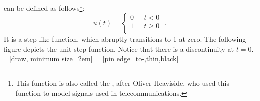  can be defined as
follows\footnote{This function is also called the
  , after Oliver
  Heaviside, who used this function to model signals used in
  telecommunications.}:
\begin{equation}
  u(t) = \left\{\begin{array}{cl}
    0 & ~~~ t < 0   \\
    1 & ~~~ t \ge 0 \\
  \end{array}
  \right. \,\,.
\end{equation}
It is a step-like function, which abruptly transitions to 1 at
zero. The following figure depicts the unit step function. Notice
that there is a discontinuity at $t=0$. %
=[draw, minimum size=2em]
 = [pin edge={to-,thin,black}]
